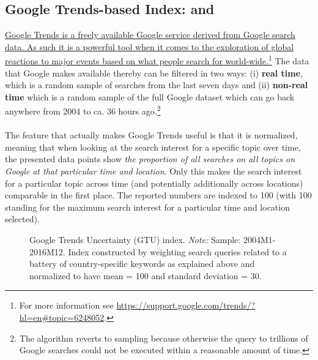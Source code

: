 \documentclass[a4paper,12pt,oneside,pointednumbers,bibtotoc,bigheadings,liststotoc]{scrbook}
\begin{document}
\subsection{Google Trends-based Index: \citet{bontempietal:16} and \citet{castelnuovoandtran:17}}
\label{sec:googletrends}
\href{https://medium.com/google-news-lab/what-is-google-trends-data-and-what-does-it-mean-b48f07342ee8}{Google Trends is a freely available Google service derived from Google search data. As such it is a powerful tool when it comes to the exploration of global reactions to major events based on what people search for world-wide.}\footnote{For more information see \url{https://support.google.com/trends/?hl=en\#topic=6248052}.} The data that Google makes available thereby can be filtered in two ways: (i) \textbf{real time}, which is a random sample of searches from the last seven days and (ii) \textbf{non-real time} which is a random sample of the full Google dataset which can go back anywhere from 2004 to ca. 36 hours ago.\footnote{The algorithm reverts to sampling because otherwise the query to trillions of Google searches could not be executed within a reasonable amount of time.} 
\\
\\
The feature that actually makes Google Trends useful is that it is normalized, meaning that when looking at the search interest for a specific topic over time, the presented data points show \textit{the proportion of all searches on all topics on Google at that particular time and location}. Only this makes the search interest for a particular topic across time (and potentially additionally across locations) comparable in the first place. The reported numbers are indexed to 100 (with 100 standing for the maximum search interest for a particular time and location selected).

\begin{figure}[h]
   \centering
   \setlength\fboxsep{0pt}
   \setlength\fboxrule{0pt}
      \caption[Google Trends Uncertainty (GTU) index.]{Google Trends Uncertainty (GTU) index.
      \textit{Note:} Sample: 2004M1-2016M12. Index constructed by weighting search queries related to a battery of country-specific keywords as explained above and normalized to have mean = 100 and standard deviation = 30.}   \label{fig:gtuindex}
\end{figure}
\end{document}
